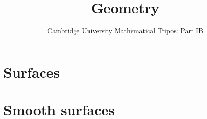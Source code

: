 \documentclass{article}
\title{Geometry}
\author{Cambridge University Mathematical Tripos: Part IB}
\begin{document}
\maketitle

\tableofcontentsnewpage{}

\section{Surfaces}

\section{Smooth surfaces}

\end{document}
